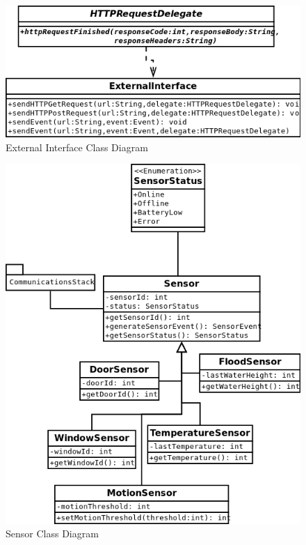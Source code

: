 \documentclass{report}
\begin{document}
\begin{figure}[hp]
    \centering
    \label{fig:external_interface_class_diagram}
    \caption{External Interface Class Diagram}
    \includegraphics[scale=0.5]{external_interface_class_diagram}
\end{figure}

\begin{figure}[hp]
    \centering
    \label{fig:sensor_class_diagram}
    \caption{Sensor Class Diagram}
    \includegraphics[scale=0.5]{sensor_class_diagram}
\end{figure}
\end{document}
